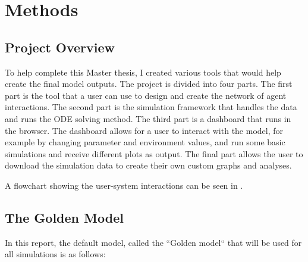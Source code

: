 \chapter{Methods}
\label{Methods}
\section{Project Overview}
To help complete this Master thesis, I created various tools that would help create the final model outputs.
The project is divided into four parts. 
The first part is the tool that a user can use to design and create the network of agent interactions. 
The second part is the simulation framework that handles the data and runs the ODE solving method. 
The third part is a dashboard that runs in the browser. The dashboard allows for a user to interact with the model, for example by changing parameter and environment values, and run some basic simulations and receive different plots as output. 
The final part allows the user to download the simulation data to create their own custom graphs and analyses. 

A flowchart showing the user-system interactions can be seen in . 

\section{The Golden Model}
\label{sec:golden_model}
In this report, the default model, called the “Golden model“ \cite{gengUsingBacterialPopulation2024} that will be used for all simulations is as follows:



